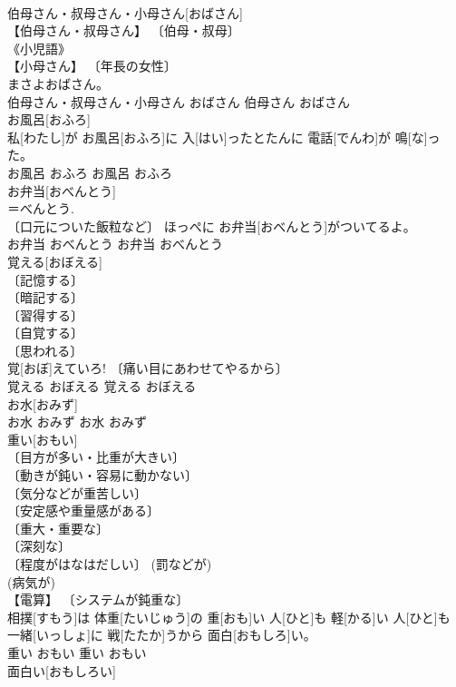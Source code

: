 \documentclass[8pt]{extreport}
\begin{document}
\begin{CJK}{UTF8}{min}
\\	伯母さん・叔母さん・小母さん[おばさん]	
\\	【伯母さん・叔母さん】 〔伯母・叔母〕 
\\	《小児語》 
\\	【小母さん】 〔年長の女性〕 
\\	まさよおばさん。	
\\	伯母さん・叔母さん・小母さん	おばさん	伯母さん	おばさん	
\\	お風呂[おふろ]	
\\	私[わたし]が お風呂[おふろ]に 入[はい]ったとたんに 電話[でんわ]が 鳴[な]った。	
\\	お風呂	おふろ	お風呂	おふろ	
\\	お弁当[おべんとう]	
\\	＝べんとう. 
\\	〔口元についた飯粒など〕	ほっぺに お弁当[おべんとう]がついてるよ。	
\\	お弁当	おべんとう	お弁当	おべんとう	
\\	覚える[おぼえる]	
\\	〔記憶する〕 
\\	〔暗記する〕 
\\	〔習得する〕 
\\	〔自覚する〕 
\\	〔思われる〕 
\\	覚[おぼ]えていろ!	〔痛い目にあわせてやるから〕 
\\	覚える	おぼえる	覚える	おぼえる	
\\	お水[おみず]	
\\	お水	おみず	お水	おみず	
\\	重い[おもい]	
\\	〔目方が多い・比重が大きい〕 
\\	〔動きが鈍い・容易に動かない〕 
\\	〔気分などが重苦しい〕 
\\	〔安定感や重量感がある〕 
\\	〔重大・重要な〕 
\\	〔深刻な〕 
\\	〔程度がはなはだしい〕 (罰などが) 
\\	(病気が) 
\\	【電算】 〔システムが鈍重な〕 
\\	相撲[すもう]は 体重[たいじゅう]の 重[おも]い 人[ひと]も 軽[かる]い 人[ひと]も 一緒[いっしょ]に 戦[たたか]うから 面白[おもしろ]い。	
\\	重い	おもい	重い	おもい	
\\	面白い[おもしろい]	

\end{CJK}
\end{document}
